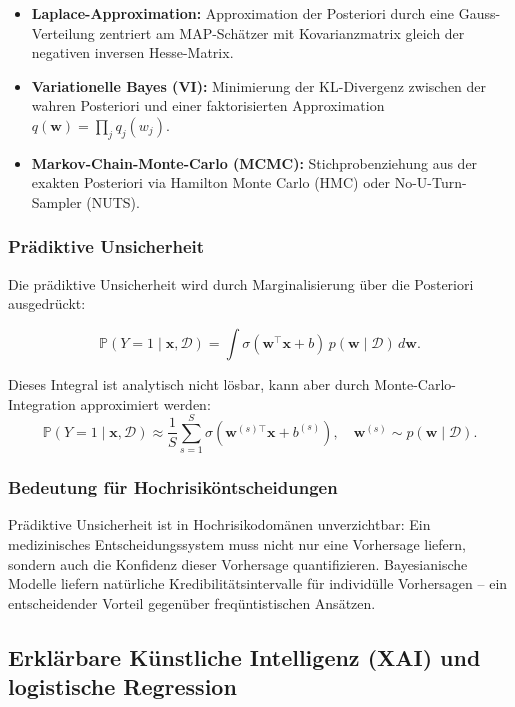 ﻿\documentclass[12pt, a4paper]{article}
\theoremstyle{definition}
\theoremstyle{remark}
\newcommand{\Prob}{\mathbb{P}}
\newcommand{\sigmoid}{\sigma}
\newcommand{\vw}{\bm{w}}
\newcommand{\vx}{\bm{x}}
\newcommand{\T}{\top}
\begin{document}
\begin{itemize}
  \item \textbf{Laplace-Approximation:} Approximation der Posteriori durch eine Gauss-Vertei\-lung
    zentriert am MAP-Schätzer mit Kovarianzmatrix gleich der negativen inversen Hesse-Matrix.
  \item \textbf{Variationelle Bayes (VI):} Minimierung der KL-Divergenz zwischen der
    wahren Posteriori und einer faktorisierten Approximation $q(\vw) = \prod_j q_j(w_j)$.
  \item \textbf{Markov-Chain-Monte-Carlo (MCMC):} Stichprobenziehung aus der exakten Posteriori
    via Hamilton Monte Carlo (HMC) oder No-U-Turn-Sampler (NUTS).
\end{itemize}

\subsubsection{Prädiktive Unsicherheit}

Die prädiktive Unsicherheit wird durch Marginalisierung über die Posteriori ausgedrückt:

\begin{equation}
  \Prob(Y=1 \mid \vx, \mathcal{D}) = \int \sigmoid(\vw^\T\vx+b)\, p(\vw\mid\mathcal{D})\, d\vw.
  \label{eq:pred_uncertainty}
\end{equation}

Dieses Integral ist analytisch nicht lösbar, kann aber durch Monte-Carlo-Integration
approximiert werden:
\[
  \Prob(Y=1 \mid \vx, \mathcal{D}) \approx \frac{1}{S}\sum_{s=1}^S \sigmoid(\vw^{(s)\T}\vx+b^{(s)}),
  \quad \vw^{(s)} \sim p(\vw\mid\mathcal{D}).
\]

\subsubsection{Bedeutung für Hochrisiköntscheidungen}

Prädiktive Unsicherheit ist in Hochrisikodomänen unverzichtbar: Ein medizinisches
Entscheidungssystem muss nicht nur eine Vorhersage liefern, sondern auch die Konfidenz dieser
Vorhersage quantifizieren. Bayesianische Modelle liefern natürliche Kredibilitätsintervalle
für individülle Vorhersagen -- ein entscheidender Vorteil gegenüber freqüntistischen Ansätzen.

\subsection{Erklärbare Künstliche Intelligenz (XAI) und logistische Regression}
\end{document}
